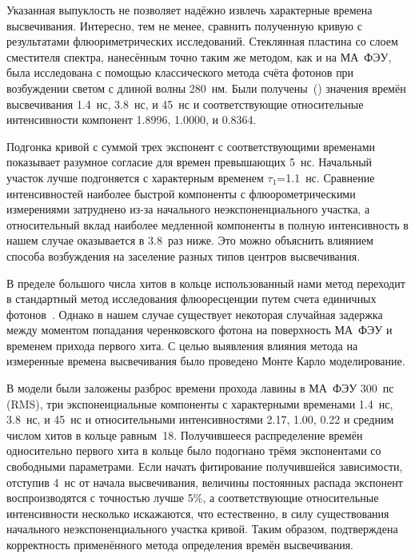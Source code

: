 Указанная выпуклость не позволяет надёжно извлечь характерные времена высвечивания. Интересно, тем не менее, сравнить полученную кривую с результатами флюориметрических исследований. Стеклянная пластина со слоем сместителя спектра, нанесённым точно таким же методом, как и на МА~ФЭУ, была исследована с помощью классического метода счёта фотонов при возбуждении светом с длиной волны 280~нм. Были получены~(\cite{DUERR}) значения времён высвечивания 1.4~нс, 3.8~нс, и 45~нс и соответствующие относительные интенсивности компонент 1.8996, 1.0000, и 0.8364.




Подгонка кривой с  суммой трех экспонент с соответствующими временами показывает разумное согласие для времен превышающих 5~нс. Начальный участок лучше подгоняется с характерным временем $\tau_{1}$=1.1~нс. Сравнение интенсивностей наиболее быстрой компоненты с флюорометрическими измерениями затруднено из-за начального неэкспоненциального участка, а относительный вклад наиболее медленной компоненты в полную интенсивность в нашем случае оказывается в 3.8~раз ниже. Это можно объяснить влиянием способа возбуждения на заселение разных типов центров высвечивания.

В пределе большого числа хитов в кольце использованный нами метод переходит в стандартный метод исследования флюоресценции путем счета единичных фотонов~\cite{SPC}. Однако в нашем случае существует некоторая случайная задержка между моментом попадания черенковского фотона на поверхность МА~ФЭУ и временем прихода первого хита. С целью выявления влияния метода на измеренные времена высвечивания было проведено Монте Карло моделирование.

В модели были заложены разброс времени прохода лавины в МА~ФЭУ 300~пс (RMS), три экспоненциальные компоненты с характерными временами 1.4~нс, 3.8~нс, и 45~нс и относительными интенсивностями 2.17, 1.00, 0.22 и средним числом хитов в кольце равным~18. Получившееся распределение времён односительно первого хита в кольце было подогнано трёмя экспонентами со свободными параметрами. Если начать фитирование получившейся зависимости, отступив 4~нс от начала высвечивания, величины постоянных распада экспонент воспроизводятся с точностью лучше 5\%, а соответствующие относительные интенсивности несколько искажаются, что естественно, в силу существования начального неэкспоненциального участка кривой. Таким образом, подтверждена корректность применённого метода определения времён высвечивания.

